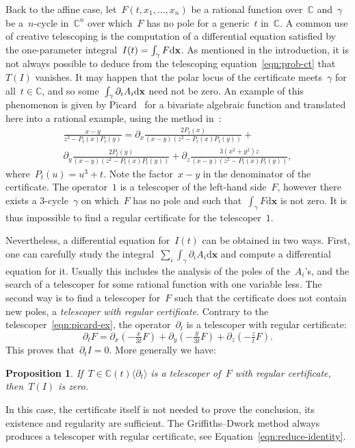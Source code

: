 \documentclass{sig-alternate}
\newtheorem{prop}[thm]{Proposition}
\newcommand{\ud}{\mathrm{d}}
\newcommand{\xx}{\mathbf{x}}
\newcommand{\CC}{\mathbb{C}}
\begin{document}
\noindent Back to the affine case, let~$F(t,x_1,\dotsc,x_n)$ be a rational function over~$\CC$ and~$\gamma$ be a~$n$-cycle in~$\CC^n$ over which~$F$ has no pole for a generic~$t$ in~$\CC$. A common use of creative telescoping is the computation of a differential equation satisfied by the one-parameter integral~$I(t)=\int_{\smash{\gamma}} F\ud \xx$.
As mentioned in the introduction, it is not always possible to deduce from the telescoping equation~\eqref{eqn:prob-ct}
that~$T(I)$ vanishes. It may happen that the polar locus of the certificate meets~$\gamma$ for all~$t \in\CC$, and so some~$\int_{\smash{\gamma}}\partial_i A_i\ud \xx$ need not be zero.
An example of this phenomenon is given by Picard~\cite{Pic99} for a bivariate algebraic function
and translated here into a rational example, using the method in~\cite[Lemma 4]{CheKauSin12}:
\begin{multline}\label{eqn:picard-ex}
  \frac{x-y}{z^2-P_t(x)P_t(y)} = \partial_x\tfrac{2 P_t(x)}{(x-y) \left(z^2-P_t(x)P_t(y)\right)} +\\
   \partial_y \tfrac{2 P_t(y)}{(x-y) \left(z^2-P_t(x)P_t(y)\right)}+\partial_z \tfrac{3 \left(x^2+y^2\right) z}{(x-y) \left(z^2-P_t(x)P_t(y)\right)} , 
\end{multline}
where~$P_t(u)=u^3+t$.
Note the factor~$x-y$ in the denominator of the certificate.
The operator~$1$ is a telescoper of the left-hand side~$F$, however
there exists a $3$-cycle~$\gamma$ on which~$F$ has no pole and such that~$\int_\gamma F\ud \xx$ is not zero. 
It is thus impossible to find a regular certificate for the telescoper~$1$.

Nevertheless, a differential equation for~$I(t)$ can be obtained in two ways.
First, one can carefully study the integral~$\sum_i\int_\gamma \partial_i A_i \ud \xx$ and compute a differential equation for it.
Usually this includes the analysis of the poles of the~$A_i$'s, and the search of a telescoper for some rational function with one variable less.
The second way is to find a telescoper for~$F$ such that the certificate does not contain new poles, a \emph{telescoper with regular certificate}.
Contrary to the telescoper~\eqref{eqn:picard-ex}, the operator~$\partial_t$ is a telescoper with regular certificate:
\[ \partial_t F = \partial_x\left( -\tfrac{x}{3t}F \right)+\partial_y\left(- \tfrac{y}{3t}F \right)+\partial_z\left(- \tfrac{z}{t}F \right). \]
This proves that~$\partial_t I = 0$. More generally we have:
\begin{prop}
  If~$T\in\CC(t)\langle \partial_t \rangle$ is a telescoper of~$F$ with regular certificate, then~$T(I)$ is zero.
\end{prop}
In this case, the certificate itself is not needed to prove the conclusion, its existence and regularity are sufficient. The Griffiths--Dwork method always produces a telescoper with regular certificate, see Equation~\eqref{eqn:reduce-identity}.
\end{document}
